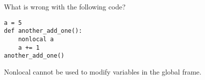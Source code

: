 \question What is wrong with the following code?
\begin{lstlisting}
a = 5
def another_add_one():
    nonlocal a
    a += 1
another_add_one()
\end{lstlisting}
\begin{solution}[0.5in]
Nonlocal cannot be used to modify variables in the global frame.
\end{solution}
